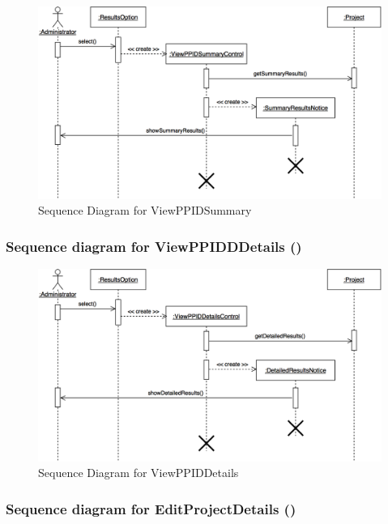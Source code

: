 \documentclass[12pt,letterpaper]{article}
\begin{document}
\begin{figure}[H]
	\centering{}
	\includegraphics[scale=0.3]{imgs/seq/view-ppid-summary.png}
	\caption{Sequence Diagram for ViewPPIDSummary}
\end{figure}

\subsubsection*{Sequence diagram for ViewPPIDDDetails (\viewppiddetails{})}

\begin{figure}[H]
	\centering{}
	\includegraphics[scale=0.3]{imgs/seq/view-ppid-details.png}
	\caption{Sequence Diagram for ViewPPIDDetails}
\end{figure}

\subsubsection*{Sequence diagram for EditProjectDetails (\editprojectdetails{})}
\end{document}
